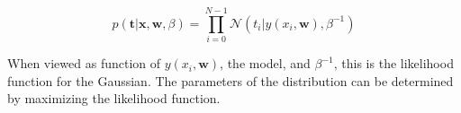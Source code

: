 \documentclass[11pt]{article} %
\begin{document}
\begin{equation}
   p(\mathbf{t} | \mathbf{x}, \mathbf{w}, \beta)= \prod_{i=0}^{N-1} \mathcal{N}\left(t_i | y(x_i, \mathbf{w}), \beta^{-1}\right)
\end{equation}

When viewed as function of $y(x_i, \mathbf{w})$, the model, and $\beta^{-1}$, this is the likelihood function for the Gaussian. The parameters of the distribution can be determined by maximizing the likelihood function. 






\end{document}
